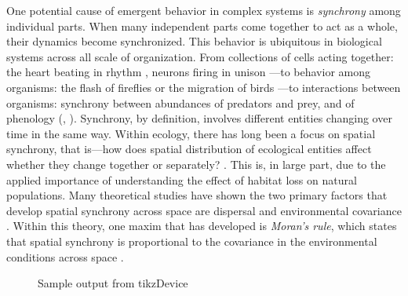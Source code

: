 \documentclass[]{article}
\begin{document}
One potential cause of emergent behavior in complex systems is \textit{synchrony} among individual parts. When many independent parts come together to act as a whole, their dynamics become synchronized.
This behavior is ubiquitous in biological systems across all scale of organization.
From collections of cells acting together: the heart beating in rhythm \cite{womelsdorf_modulation_2007}, neurons firing in unison \cite{strogatz_sync_2003}---to behavior among organisms: the flash of fireflies \cite{otte_theories_1980} or the migration of birds \cite{spottiswoode_extrapair_2004}---to interactions between organisms: synchrony between abundances of predators and prey, and of phenology (\cite{van_asch_phenology_2007}, \cite{burkle_future_2011}).
Synchrony, by definition, involves different entities changing over time in the same way. Within ecology, there has long been a focus on spatial synchrony, that is—how does spatial distribution of ecological entities affect whether they change together or separately? \cite{jarillo_spatial_2020, kendall_dispersal_2000, hanski_spatial_1993}.
This is, in large part, due to the applied importance of understanding the effect of habitat loss on natural populations. Many theoretical studies have shown the two primary factors that develop spatial synchrony across space are dispersal and environmental covariance \cite{ripa_analysing_2000, abbott_does_2007}.
Within this theory, one maxim that has developed is \textit{Moran's rule}, which states that spatial synchrony is proportional to the covariance in the environmental conditions across space \cite{ranta_synchrony_1995, bjornstad_spatial_1999}.


\begin{figure}
	    \centering
		
		\caption{Sample output from tikzDevice}
		\label{plot:test}
	\end{figure}

\clearpage
{
\footnotesize

}
\end{document}
